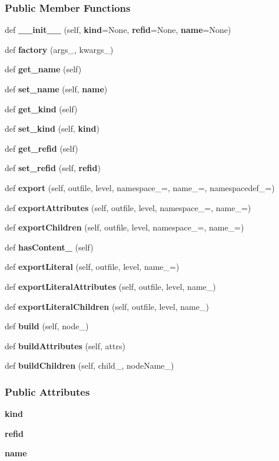\subsubsection*{Public Member Functions}
\begin{DoxyCompactItemize}
\item 
def {\bf \+\_\+\+\_\+init\+\_\+\+\_\+} (self, {\bf kind}=None, {\bf refid}=None, {\bf name}=None)
\item 
def {\bf factory} (args\+\_\+, kwargs\+\_\+)
\item 
def {\bf get\+\_\+name} (self)
\item 
def {\bf set\+\_\+name} (self, {\bf name})
\item 
def {\bf get\+\_\+kind} (self)
\item 
def {\bf set\+\_\+kind} (self, {\bf kind})
\item 
def {\bf get\+\_\+refid} (self)
\item 
def {\bf set\+\_\+refid} (self, {\bf refid})
\item 
def {\bf export} (self, outfile, level, namespace\+\_\+=\textquotesingle{}\textquotesingle{}, name\+\_\+=\textquotesingle{}, namespacedef\+\_\+=\textquotesingle{}\textquotesingle{})
\item 
def {\bf export\+Attributes} (self, outfile, level, namespace\+\_\+=\textquotesingle{}\textquotesingle{}, name\+\_\+=\textquotesingle{})
\item 
def {\bf export\+Children} (self, outfile, level, namespace\+\_\+=\textquotesingle{}\textquotesingle{}, name\+\_\+=\textquotesingle{})
\item 
def {\bf has\+Content\+\_\+} (self)
\item 
def {\bf export\+Literal} (self, outfile, level, name\+\_\+=\textquotesingle{})
\item 
def {\bf export\+Literal\+Attributes} (self, outfile, level, name\+\_\+)
\item 
def {\bf export\+Literal\+Children} (self, outfile, level, name\+\_\+)
\item 
def {\bf build} (self, node\+\_\+)
\item 
def {\bf build\+Attributes} (self, attrs)
\item 
def {\bf build\+Children} (self, child\+\_\+, node\+Name\+\_\+)
\end{DoxyCompactItemize}
\subsubsection*{Public Attributes}
\begin{DoxyCompactItemize}
\item 
{\bf kind}
\item 
{\bf refid}
\item 
{\bf name}
\end{DoxyCompactItemize}
